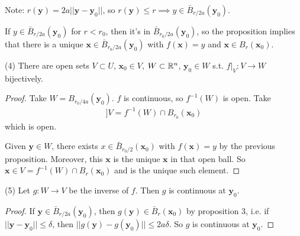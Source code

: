 \documentclass[a4paper]{article}
\begin{document}
Note: $r\left(\mathbf{y}\right) = 2a||\mathbf{y}-\mathbf{y}_0||$, so $r\left(\mathbf{y}\right) \leq r \implies y \in \bar{B}_{r/2a} \left(\mathbf{y}_0\right)$.

\begin{rem}
If $y\in \bar{B}_{r/2a} \left(\mathbf{y}_0\right)$ for $r<r_0$, then it's in $\bar{B}_{r_0/2a} \left(\mathbf{y}_0\right)$, so the proposition implies that there is a unique $\mathbf{x} \in \bar{B}_{r_0/2a}\left(\mathbf{y}_0\right)$ with $f\left(\mathbf{x}\right) = y$ and $\mathbf{x} \in B_r\left(\mathbf{x}_0\right)$.
\end{rem}

\begin{prop}(4)
There are open sets $V \subset U$, $\mathbf{x}_0 \in V$, $W \subset \mathbb{R}^n$, $\mathbf{y}_0 \in W$ s.t. $f|_V:V \to W$ bijectively.
\begin{proof}
Take $W = B_{r_0/4a}\left(\mathbf{y}_0\right)$. $f$ is continuous, so $f^{-1}\left(W\right)$ is open. Take
\begin{equation*}
\begin{aligned}]
V = f^{-1}\left(W\right) \cap B_{r_0}\left(\mathbf{x}_0\right)
\end{aligned}
\end{equation*}
which is open.

Given $\mathbf{y} \in W$, there exists $x \in \bar{B}_{r_0/2} \left(\mathbf{x}_0\right)$ with $f\left(\mathbf{x}\right) = y$ by the previous proposition. Moreover, this $\mathbf{x}$ is the unique $\mathbf{x}$ in that open ball. So $\mathbf{x} \in V = f^{-1}\left(W\right) \cap B_r\left(\mathbf{x}_0\right)$ and is the unique such element.
\end{proof}
\end{prop}

\begin{prop}(5)
Let $g:W \to V$ be the inverse of $f$. Then $g$ is continuous at $\mathbf{y}_0$.
\begin{proof}
If $\mathbf{y} \in \bar{B}_{r/2a}\left(\mathbf{y}_0\right)$, then $g\left(\mathbf{y}\right) \in \bar{B}_r\left(\mathbf{x}_0\right)$ by proposition 3, i.e. if $||\mathbf{y}-\mathbf{y}_0|| \leq \delta$, then $||g\left(\mathbf{y}\right) - g\left(\mathbf{y}_0\right)|| \leq 2a\delta$. So $g$ is continuous at $\mathbf{y}_0$.
\end{proof}
\end{prop}
\end{document}
